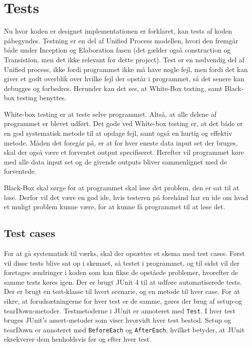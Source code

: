 \chapter{Tests}\label{ch:tests}
Nu hvor koden er designet implementationen er forklaret, kan tests af koden påbegyndes. Testning er en del af Unified Process modellen, hvori den fremgår både under Inception og Elaboration fasen (det gælder også construction og Transistion, men det ikke relevant for dette project)\cite{UP}. Test er en nødvendig del af Unified process, ikke fordi programmet ikke må have nogle fejl, men fordi det kan giver et godt overblik over hvilke fejl der opstår i programmet, så det senere kan debugges og forbedres\cite{sestoft2008systematic}. Herunder kan det ses, at White-Box testing, samt Black-box testing benyttes. 

White-box testing er at teste selve programmet. Altså, at alle delene af programmet er blevet udført. Det gode ved White-box testing er, at det både er en god systematisk metode til at opdage fejl, samt også en hurtig og effektiv metode. Måden det foregår på, er at for hver eneste data input set der bruges, skal der også være et forventet output specifiseret. Herefter vil programmet køre med alle data input set og de givende outputs bliver sammenlignet med de forventede\cite{sestoft2008systematic}.

Black-Box skal sørge for at programmet skal løse det problem, den er sat til at løse. Derfor vil det være en god ide, hvis testeren på forehånd har en ide om hvad et muligt problem kunne være, for at kunne få programmet til at løse det\cite{sestoft2008systematic}. 

\section{Test cases}
For at gå systematisk til værks, skal der opsættes et skema med test cases\cite{Heumann}. Først vil disse tests blive sat op i skemaet, så testet i programmet, og til sidst vil der foretages ændringer i koden som kan fikse de opståede problemer, hvorefter de samme tests køres igen.
Der er brugt JUnit 4 \cite{JUnit} til at udføre automatiserede tests. Der er brugt en test-klasse til hvert scenarie, og en metode til hver case. For at sikre, at forudsætningerne for hver test er de samme, gøres der brug af setup-og tearDown-metoder. Testmetoderne i JUnit er annoteret med \verb|Test|. I hver test bruges JUnit’s assert-metoder som viser hvorvidt hver test bestod. Setup og tearDown er annoteret med \verb|BeforeEach| og \verb|AfterEach|, hvilket betyder, at JUnit eksekverer dem henholdsvis før og efter hver test\cite{MiniprojektTest}.
